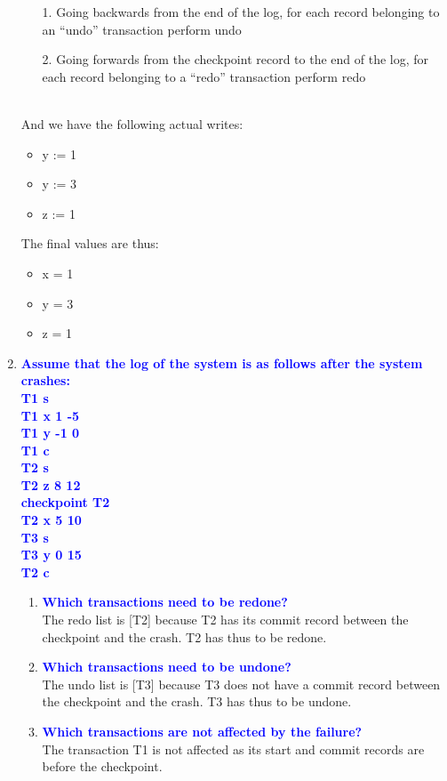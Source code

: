 \documentclass[11pt]{article}
\begin{document}
\begin{enumerate}
    \begin{itemize}
        \item [1.] Going backwards from the end of the log, for each record belonging to an “undo” transaction perform undo
        \item [2.] Going forwards from the checkpoint record to the end of the log, for each record belonging to a “redo” transaction perform redo
    \end{itemize}
    \\ And we have the following actual writes:
    \begin{itemize}
        \item y := 1
        \item y := 3
        \item z := 1
    \end{itemize}
    The final values are thus:
    \begin{itemize}
        \item x = 1
        \item y = 3
        \item z = 1
    \end{itemize}

\item \textbf{\textcolor{blue}{Assume that the log of the system is as follows after the system crashes:
\\ T1 s
\\ T1 x 1 -5
\\ T1 y -1 0
\\ T1 c
\\ T2 s
\\ T2 z 8 12
\\ checkpoint T2
\\ T2 x 5 10
\\ T3 s
\\ T3 y 0 15
\\ T2 c}}
    \begin{enumerate}
        \item \textbf{\textcolor{blue}{Which transactions need to be redone?}}
            \\ The redo list is [T2] because T2 has its commit record between the checkpoint and the crash. T2 has thus to be redone.
        \item \textbf{\textcolor{blue}{Which transactions need to be undone?}}
            \\ The undo list is [T3] because T3 does not have a commit record between the checkpoint and the crash. T3 has thus to be undone.
        \item \textbf{\textcolor{blue}{Which transactions are not affected by the failure?}}
            \\ The transaction T1 is not affected as its start and commit records are before the checkpoint.
    \end{enumerate}
\end{enumerate}
\end{document}
